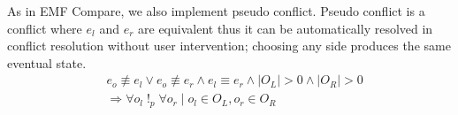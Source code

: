 As in EMF Compare, we also implement pseudo conflict. Pseudo conflict is a conflict where $e_{l}$ and $e_{r}$ are equivalent thus it can be automatically resolved in conflict resolution without user intervention; choosing any side produces the same eventual state.
\begin{equation} \label{eq:conflict_3.5}
\begin{split}
& e_{o} \not\equiv e_{l} \vee e_{o} \not\equiv e_{r} \wedge e_{l} \equiv e_{r} \wedge |O_{L}| > 0 \wedge |O_{R}| > 0\\
& \Rightarrow \forall o_{l} \;!_{p}\; \forall o_{r} \;|\; o_{l} \in O_{L}, o_{r} \in O_{R}
\end{split}
\end{equation} 



%



